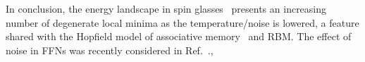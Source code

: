 \documentclass{article}
\begin{document}
%

In conclusion, the energy landscape in spin glasses~\cite{parisi2, giardina} presents an increasing number of degenerate local minima as the temperature/noise is lowered, a feature shared with the Hopfield model of associative memory~\cite{amit} and RBM. The effect of noise in FFNs was recently considered in Ref.~\cite{pratik}.,%
\end{document}
